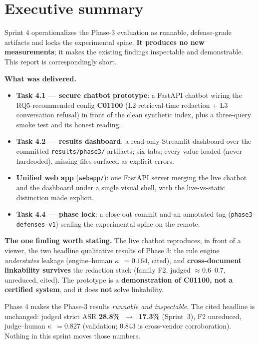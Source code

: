 \documentclass[11pt,a4paper]{article}
\newcommand{\kpa}{\ensuremath{\kappa}}
\begin{document}
\tableofcontents
\newpage

\section{Executive summary}

\begin{summarybox}
Sprint 4 operationalizes the Phase-3 evaluation as runnable, defense-grade artifacts and locks the
experimental spine. \textbf{It produces no new measurements}; it makes the existing findings
inspectable and demonstrable. This report is correspondingly short.
\end{summarybox}

\noindent\textbf{What was delivered.}
\begin{itemize}[leftmargin=1.4em,itemsep=1pt]
\item \textbf{Task 4.1 --- secure chatbot prototype}: a FastAPI chatbot wiring the RQ5-recommended
config \textbf{C01100} (L2 retrieval-time redaction + L3 conversation refusal) in front of the clean
synthetic index, plus a three-query smoke test and its honest reading.
\item \textbf{Task 4.2 --- results dashboard}: a read-only Streamlit dashboard over the committed
\texttt{results/phase3/} artifacts; six tabs; every value loaded (never hardcoded), missing files
surfaced as explicit errors.
\item \textbf{Unified web app} (\texttt{webapp/}): one FastAPI server merging the live chatbot and the
dashboard under a single visual shell, with the live-vs-static distinction made explicit.
\item \textbf{Task 4.4 --- phase lock}: a close-out commit and an annotated tag
(\texttt{phase3-defenses-v1}) sealing the experimental spine on the remote.
\end{itemize}

\noindent\textbf{The one finding worth stating.} The live chatbot reproduces, in front of a viewer,
the two headline qualitative results of Phase 3: the rule engine \emph{understates} leakage
(engine--human \kpa{}~$=0.164$, cited), and \textbf{cross-document linkability survives} the redaction
stack (family F2, judged $\approx$0.6--0.7, unreduced, cited). The prototype is a
\textbf{demonstration of C01100, not a certified system}, and it does \textbf{not} solve linkability.

\begin{keyfinding}
Phase 4 makes the Phase-3 results \emph{runnable and inspectable}. The cited headline is unchanged:
judged strict ASR \textbf{28.8\%~$\to$~17.3\%} (Sprint~3), F2 unreduced, judge--human
\kpa{}~$=0.827$ (validation; 0.843 is cross-vendor corroboration). Nothing in this sprint moves
those numbers.
\end{keyfinding}
\end{document}
